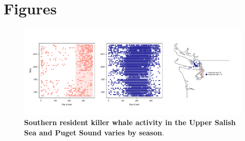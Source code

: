 \documentclass{article}
\begin{document}



\section* {Figures}

\begin{figure}[h!]
\includegraphics{../analyses/figures/OrcaPhenPlots/srkw_phenmap.pdf} 
\caption{\textbf{Southern resident killer whale activity in the Upper Salish Sea and Puget Sound varies by season}. }
 \label{fig:phenplot}
 \end{figure}
 

 
\end{document}
